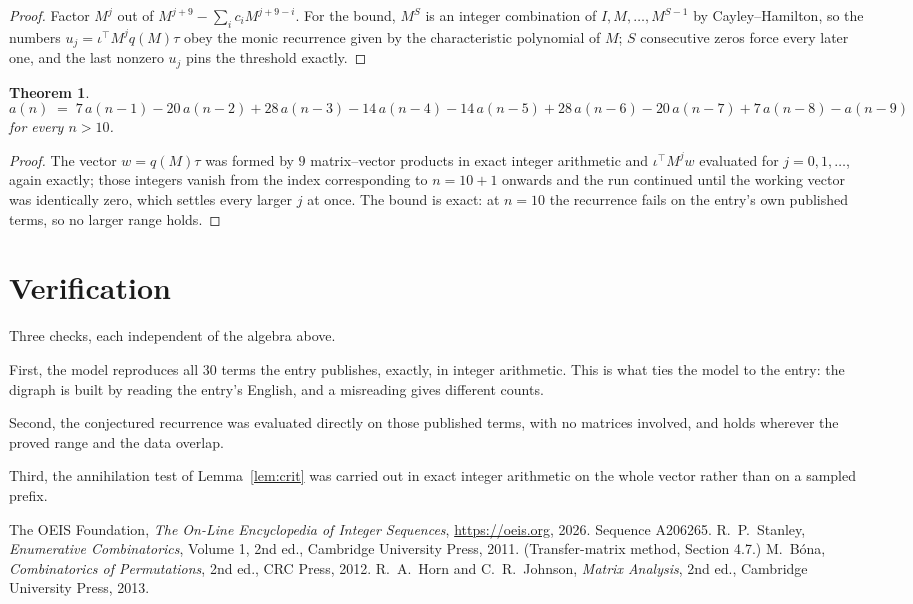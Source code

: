 \documentclass[11pt,a4paper]{article}
\theoremstyle{plain}
\newtheorem{theorem}{Theorem}
\theoremstyle{definition}
\begin{document}
\begin{proof}
Factor $M^{j}$ out of $M^{j+9}-\sum_ic_iM^{j+9-i}$. For the bound, $M^{S}$
is an integer combination of $I,M,\dots,M^{S-1}$ by Cayley--Hamilton, so the numbers
$u_j=\iota^{\!\top}M^{j}q(M)\tau$ obey the monic recurrence given by the characteristic
polynomial of $M$; $S$ consecutive zeros force every later one, and the last nonzero $u_j$
pins the threshold exactly.
\end{proof}

\begin{theorem}
\[
a(n)\;=\;7\,a(n-1) - 20\,a(n-2) + 28\,a(n-3) - 14\,a(n-4) - 14\,a(n-5) + 28\,a(n-6) - 20\,a(n-7) + 7\,a(n-8) - a(n-9)
\]
for every $n>10$.
\end{theorem}

\begin{proof}
The vector $w=q(M)\tau$ was formed by $9$ matrix--vector products in exact integer
arithmetic and $\iota^{\!\top}M^{j}w$ evaluated for $j=0,1,\dots$, again exactly; those
integers vanish from the index corresponding to $n=10+1$ onwards and the run continued
until the working vector was identically zero, which settles every larger $j$ at once. The bound is exact: at $n=10$ the recurrence fails on the entry's own published terms, so no larger range holds.
\end{proof}

\section{Verification}

Three checks, each independent of the algebra above.

First, the model reproduces all $30$ terms the entry publishes, exactly, in integer
arithmetic. This is what ties the model to the entry: the digraph is built by reading the
entry's English, and a misreading gives different counts.

Second, the conjectured recurrence was evaluated directly on those published terms, with no
matrices involved, and holds wherever the proved range and the data overlap.

Third, the annihilation test of Lemma~\ref{lem:crit} was carried out in exact integer
arithmetic on the whole vector rather than on a sampled prefix.

\begin{thebibliography}{9}
 The OEIS Foundation, \emph{The On-Line Encyclopedia of Integer
Sequences}, \url{https://oeis.org}, 2026. Sequence A206265.
 R.~P.~Stanley, \emph{Enumerative Combinatorics}, Volume 1, 2nd ed.,
Cambridge University Press, 2011. (Transfer-matrix method, Section 4.7.)
 M.~B\'ona, \emph{Combinatorics of Permutations}, 2nd ed., CRC
Press, 2012.
 R.~A.~Horn and C.~R.~Johnson, \emph{Matrix Analysis}, 2nd ed., Cambridge
University Press, 2013.
\end{thebibliography}
\end{document}
